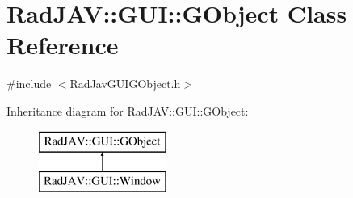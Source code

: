 \hypertarget{class_rad_j_a_v_1_1_g_u_i_1_1_g_object}{}\section{Rad\+J\+AV\+:\+:G\+UI\+:\+:G\+Object Class Reference}
\label{class_rad_j_a_v_1_1_g_u_i_1_1_g_object}


{\ttfamily \#include $<$Rad\+Jav\+G\+U\+I\+G\+Object.\+h$>$}

Inheritance diagram for Rad\+J\+AV\+:\+:G\+UI\+:\+:G\+Object\+:\begin{figure}[H]
\begin{center}
\leavevmode
\includegraphics[height=2.000000cm]{class_rad_j_a_v_1_1_g_u_i_1_1_g_object}
\end{center}
\end{figure}
